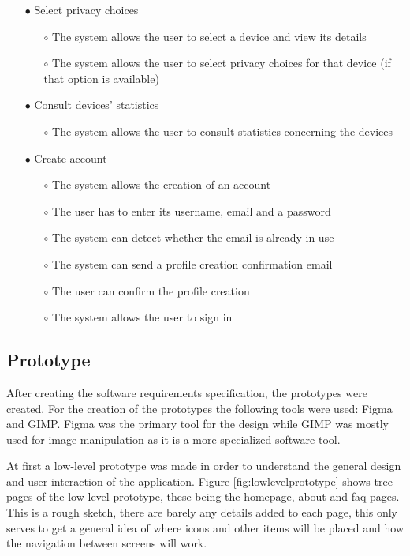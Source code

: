 \begin{itemize}
\begin{itemize}
    \end{itemize}
    \item[$\bullet$] Select privacy choices
    \begin{itemize}
        \item[$\circ$] The system allows the user to select a device and view its details
        \item[$\circ$] The system allows the user to select privacy choices for that device (if that option is available)
    \end{itemize}
    \item[$\bullet$] Consult devices' statistics
    \begin{itemize}
        \item[$\circ$] The system allows the user to consult statistics concerning the devices
    \end{itemize}
    \item[$\bullet$] Create account
    \begin{itemize}
        \item[$\circ$] The system allows the creation of an account
        \item[$\circ$] The user has to enter its username, email and a password
        \item[$\circ$] The system can detect whether the email is already in use
        \item[$\circ$] The system can send a profile creation confirmation email
        \item[$\circ$] The user can confirm the profile creation
        \item[$\circ$] The system allows the user to sign in
    \end{itemize}
\end{itemize}

\subsection{Prototype}

After creating the software requirements specification, the prototypes were
created. For the creation of the prototypes the following tools were used: Figma
and GIMP. Figma was the primary tool for the design while GIMP was mostly used
for image manipulation as it is a more specialized software tool.

At first a low-level prototype was made in order to understand the
general design and user interaction of the application. Figure \ref{fig:lowlevelprototype}
shows tree pages of the low level prototype, these being the homepage, about
and faq pages. This is a rough sketch, there are barely any details added to each page,
this only serves to get a general idea of where icons and other items
will be placed and how the navigation between screens will work.

